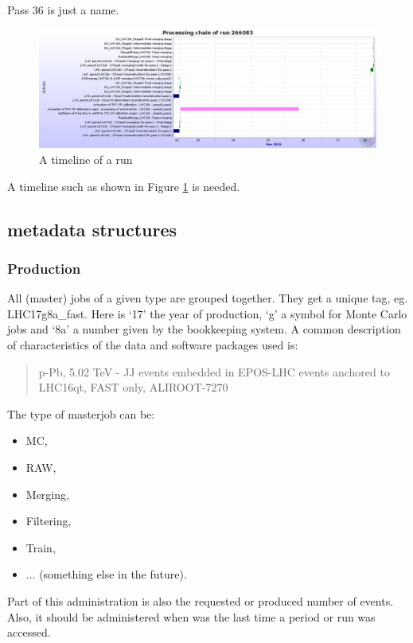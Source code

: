 Pass 36 is just a name. 

\begin{figure}
  \begin{center}
    \includegraphics[scale=0.25]{./images/timeline.png}
    \caption{A timeline of a run}
    \label{fig:timeline}
  \end{center}
\end{figure}

A timeline such as shown in Figure \ref{fig:timeline} is needed.

\subsection{metadata structures}
\subsubsection{Production}
All (master) jobs of a given type are grouped together. They get a unique tag, eg. LHC17g8a\_fast. Here is `17' the year of production, `g' a symbol for Monte Carlo jobs and `8a' a number given by the bookkeeping system. A common description of characteristics of the data and software packages used is:
\begin{quotation}
p-Pb, 5.02 TeV - JJ events embedded in EPOS-LHC events anchored to LHC16qt, FAST only, ALIROOT-7270
\end{quotation}
The type of masterjob can be:
\begin{itemize}
  \item MC,
  \item RAW, 
  \item Merging, 
  \item Filtering, 
  \item Train, 
  \item ... (something else in the future).
\end{itemize}
Part of this administration is also the requested or produced number of events. Also, it should be administered when was the last time a period or run was accessed.

